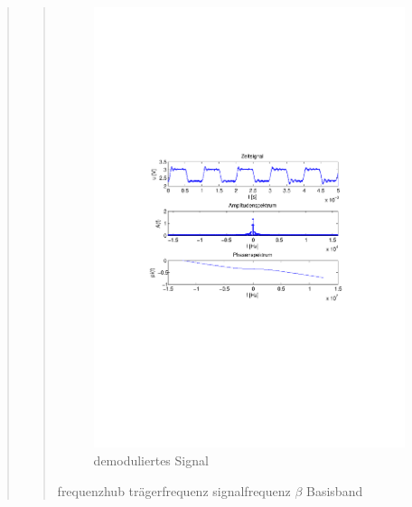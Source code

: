\begin{quote}
\begin{quote}
        \begin{figure}[H]
			\begin{center}
			\includegraphics[scale=0.7, trim = 35mm 100mm 35mm 95mm,clip]{Bilder/f1filB}
			\end{center}
		\caption{demoduliertes Signal}
		\label{fig:filter2}
	    \end{figure}
        
        frequenzhub
        trägerfrequenz
        signalfrequenz
        $\beta$
        Basisband
       
        
    \end{quote}
    
\end{quote}



%     
%         

